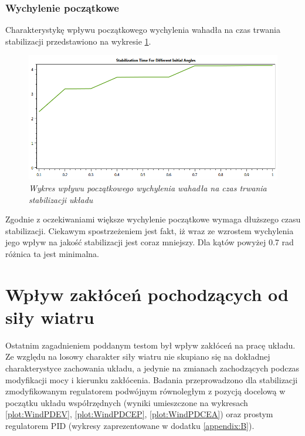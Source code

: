 \documentclass[12pt, twoside, openany]{report}
\theoremstyle{definition}
\begin{document}
\subsubsection{Wychylenie początkowe}
Charakterystykę wpływu początkowego wychylenia wahadła na czas trwania stabilizacji przedstawiono na wykresie \ref{plot:PendulumAngleQuality}.
\begin{figure}[H]
	\centering
		\includegraphics[width = 350pt]{PendulumAngleQuality} 
		\caption{\textit{Wykres wpływu początkowego wychylenia wahadła na czas trwania stabilizacji układu}}
		\label{plot:PendulumAngleQuality}
\end{figure}

Zgodnie z oczekiwaniami większe wychylenie początkowe wymaga dłuższego czasu stabilizacji. Ciekawym spostrzeżeniem jest fakt, iż wraz ze wzrostem wychylenia jego wpływ na jakość stabilizacji jest coraz mniejszy. Dla kątów powyżej 0.7 rad różnica ta jest minimalna.

\section{Wpływ zakłóceń pochodzących od siły wiatru}
Ostatnim zagadnieniem poddanym testom był wpływ zakłóceń na pracę układu. Ze względu na losowy charakter siły wiatru nie skupiano się na dokładnej charakterystyce zachowania układu, a jedynie na zmianach zachodzących podczas modyfikacji mocy i kierunku zakłócenia. Badania przeprowadzono dla stabilizacji zmodyfikowanym regulatorem podwójnym równoległym z pozycją docelową w początku układu współrzędnych (wyniki umieszczone na wykresach \ref{plot:WindPDEV}, \ref{plot:WindPDCEP}, \ref{plot:WindPDCEA}) oraz prostym regulatorem PID (wykresy zaprezentowane w dodatku \ref{appendix:B}).
\end{document}
